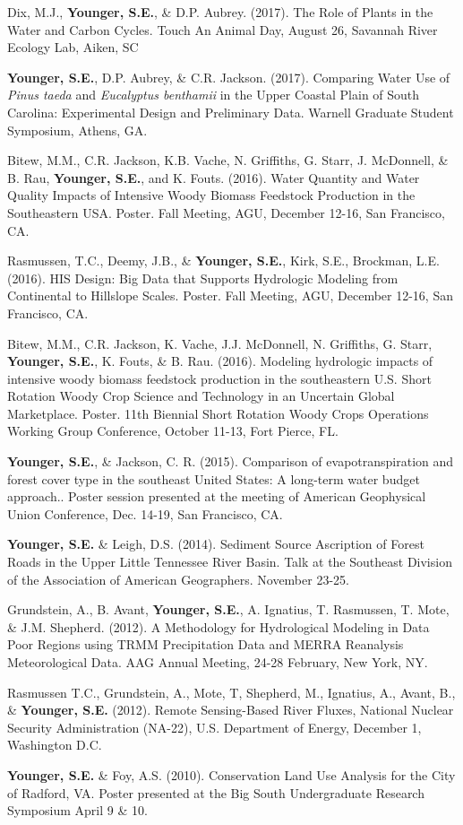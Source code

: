 \documentclass[10pt,letterpaper]{article}
\begin{document}
\begin{hangparas}{.25in}{1}
		Dix, M.J., \textbf{Younger, S.E.}, \& D.P. Aubrey. (2017). The Role of Plants in the Water and Carbon Cycles. Touch An Animal Day, August 26, Savannah River Ecology Lab, Aiken, SC
		
		\textbf{Younger, S.E.}, D.P. Aubrey, \& C.R. Jackson. (2017). Comparing Water Use of \textit{Pinus taeda} and \textit{Eucalyptus benthamii} in the Upper Coastal Plain of South Carolina: Experimental Design and Preliminary Data. Warnell Graduate Student Symposium, Athens, GA. 
		
		Bitew, M.M., C.R. Jackson, K.B. Vache, N. Griffiths, G. Starr, J. McDonnell, \& B. Rau, \textbf{Younger, S.E.}, and K. Fouts. (2016). Water Quantity and Water Quality Impacts of Intensive Woody Biomass Feedstock Production in the Southeastern USA. Poster. Fall Meeting, AGU, December 12-16, San Francisco, CA. 
		
		Rasmussen, T.C., Deemy, J.B., \& \textbf{Younger, S.E.}, Kirk, S.E., Brockman, L.E. (2016). HIS Design: Big Data that Supports Hydrologic Modeling from Continental to Hillslope Scales. Poster. Fall Meeting, AGU, December 12-16, San Francisco, CA. 
		
		Bitew, M.M., C.R. Jackson, K. Vache, J.J. McDonnell, N. Griffiths, G. Starr, \textbf{Younger, S.E.}, K. Fouts, \& B. Rau. (2016). Modeling hydrologic impacts of intensive woody biomass feedstock production in the southeastern U.S. Short Rotation Woody Crop Science and Technology in an Uncertain Global Marketplace. Poster. 11th Biennial Short Rotation Woody Crops Operations Working Group Conference, October 11-13, Fort Pierce, FL.
		
		\textbf{Younger, S.E.}, \& Jackson, C. R. (2015). Comparison of evapotranspiration and forest cover type in the southeast United States: A long-term water budget approach.. Poster session presented at the meeting of American Geophysical Union Conference, Dec. 14-19, San Francisco, CA.
		
		\textbf{Younger, S.E.} \& Leigh, D.S. (2014). Sediment Source Ascription of Forest Roads in the Upper Little Tennessee River Basin. Talk at the Southeast Division of the Association of American Geographers. November 23-25.
		
		Grundstein, A., B. Avant, \textbf{Younger, S.E.}, A. Ignatius, T. Rasmussen, T. Mote, \& J.M. Shepherd. (2012). A Methodology for Hydrological Modeling in Data Poor Regions using TRMM Precipitation Data and MERRA Reanalysis Meteorological Data. AAG Annual Meeting, 24-28 February, New York, NY.
		
		Rasmussen T.C., Grundstein, A., Mote, T, Shepherd, M., Ignatius, A., Avant, B., \& \textbf{Younger, S.E.} (2012). Remote Sensing-Based River Fluxes, National Nuclear Security Administration (NA-22), U.S. Department of Energy, December 1, Washington D.C.
		
		\textbf{Younger, S.E.} \& Foy, A.S. (2010). Conservation Land Use Analysis for the City of Radford, VA. Poster presented at the Big South Undergraduate Research Symposium April 9 \& 10.
		
	\end{hangparas}
	
\end{document}
